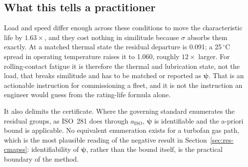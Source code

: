 \subsection*{What this tells a practitioner}
Load and speed differ enough across these conditions to move the characteristic life by
$1.63\times$, and they cost nothing in similitude because $\sigma$ absorbs them exactly. At a matched
thermal state the residual departure is 0.091; a 25\,$^\circ$C spread in operating temperature
raises it to 1.060, roughly $12\times$ larger. For rolling-contact fatigue it is therefore the
thermal and lubrication state, not the load, that breaks similitude and has to be matched or
reported as $\boldsymbol\psi$. That is an actionable instruction for commissioning a fleet, and it
is not the instruction an engineer would guess from the rating-life formula alone.

It also delimits the certificate. Where the governing standard enumerates the residual groups, as
ISO~281 does through $a_{\mathrm{ISO}}$, $\boldsymbol\psi$ is identifiable and the a-priori bound is
applicable. No equivalent enumeration exists for a turbofan gas path, which is the most plausible
reading of the negative result in Section~\ref{sec:res-cmapss}: identifiability of
$\boldsymbol\psi$, rather than the bound itself, is the practical boundary of the method.
